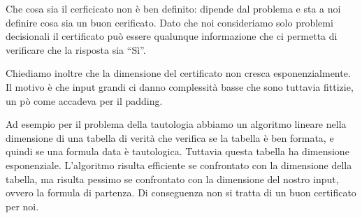 Che cosa sia il cerficicato non è ben definito: dipende dal problema e sta a noi definire cosa sia
un buon cerificato. Dato che noi consideriamo solo problemi decisionali il certificato può essere
qualunque informazione che ci permetta di verificare che la risposta sia ``Sì''.

Chiediamo inoltre che la dimensione del certificato non cresca esponenzialmente. Il motivo è che
input grandi ci danno complessità basse che sono tuttavia fittizie, un pò come accadeva per il
padding.

Ad esempio per il problema della tautologia abbiamo un algoritmo lineare nella dimensione di una
tabella di verità che verifica se la tabella è ben formata, e quindi se una formula data è
tautologica. Tuttavia questa tabella ha dimensione esponenziale. L'algoritmo risulta efficiente se
confrontato con la dimensione della tabella, ma risulta pessimo se confrontato con la dimensione del
nostro input, ovvero la formula di partenza. Di conseguenza non si tratta di un buon certificato per
noi.


